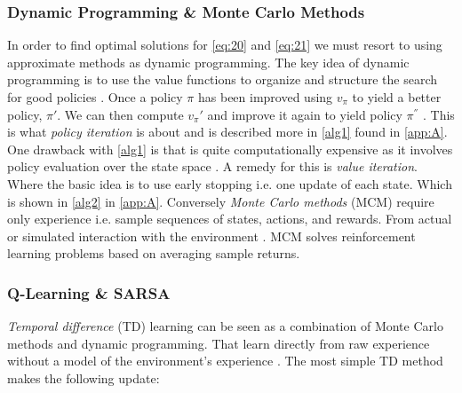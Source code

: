 \documentclass{kththesis}
\theoremstyle{definition}
\begin{document}
\subsubsection*{Dynamic Programming \& Monte Carlo Methods}
In order to find optimal solutions for \autoref{eq:20} and \autoref{eq:21} we must resort to using approximate methods as dynamic programming. The key idea of dynamic programming is to use the value functions to organize and structure the search for good policies \parencite{sutton1998reinforcement, szepesvari2009algorithms}. Once a policy $\pi$ has been improved using $v_{\pi}$ to yield a better policy,  $\pi'$. We can then compute $v_{\pi}'$ and improve it again to yield policy $\pi^{''}$ \parencite{sutton1998reinforcement}. This is what \textit{policy iteration} is about and is described more in \autoref{alg1} found in \autoref{app:A}.
\newline
\newline
One drawback with \autoref{alg1} is that is quite computationally expensive as it involves policy evaluation over the state space \parencite{sutton1998reinforcement}. A remedy for this is \textit{value iteration}. Where the basic idea is to use early stopping i.e. one update of each state. Which is shown in \autoref{alg2} in \autoref{app:A}. Conversely \textit{Monte Carlo methods} (MCM) require only experience i.e. sample sequences of states, actions, and rewards. From actual or simulated interaction with the environment \parencite{sutton1998reinforcement}. MCM solves reinforcement learning problems based on averaging sample returns. 


\subsubsection*{Q-Learning \& SARSA}
\textit{Temporal difference} (TD) learning can be seen as a combination of Monte Carlo methods and dynamic programming. That learn directly from raw experience without a model of the environment's experience \parencite{sutton1998reinforcement, arulkumaran2017brief}. The most simple TD method makes the following update:
\end{document}
